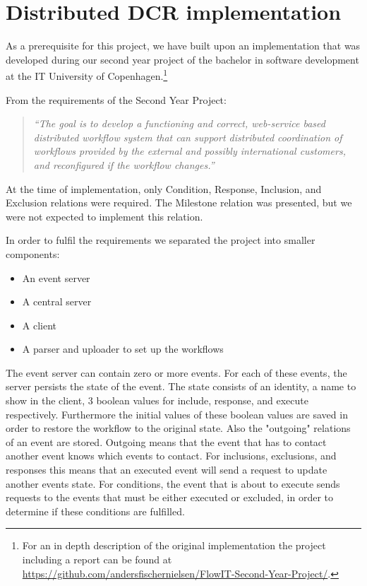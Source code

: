 	\section{Distributed DCR implementation}
		As a prerequisite for this project, we have built upon an implementation that was developed during our second year project of the bachelor in software development at the IT University of Copenhagen.\footnote{For an in depth description of the original implementation the project including a report can be found at \url{https://github.com/andersfischernielsen/FlowIT-Second-Year-Project/}.}
		
		\newpar From the requirements of the Second Year Project:
		
		\begin{quotation}
			\noindent\textit{``The goal is to develop a functioning and correct, web-service based distributed workflow system that can support distributed coordination of workflows provided by the external and possibly international customers, and reconfigured if the workflow changes.''}
		\end{quotation}
		
		\newpar At the time of implementation, only Condition, Response, Inclusion, and Exclusion relations were required. The Milestone relation was presented, but we were not expected to implement this relation.
		
		\newpar In order to fulfil the requirements we separated the project into smaller components:
		
		\begin{itemize}
			\item An event server
			\item A central server
			\item A client
			\item A parser and uploader to set up the workflows
		\end{itemize}
		
		\newpar The event server can contain zero or more events. For each of these events, the server persists the state of the event. The state consists of an identity, a name to show in the client, 3 boolean values for include, response, and execute respectively. Furthermore the initial values of these boolean values are saved in order to restore the workflow to the original state. Also the "outgoing" relations of an event are stored. Outgoing means that the event that has to contact another event knows which events to contact. For inclusions, exclusions, and responses this means that an executed event will send a request to update another events state. For conditions, the event that is about to execute sends requests to the events that must be either executed or excluded, in order to determine if these conditions are fulfilled.
		

